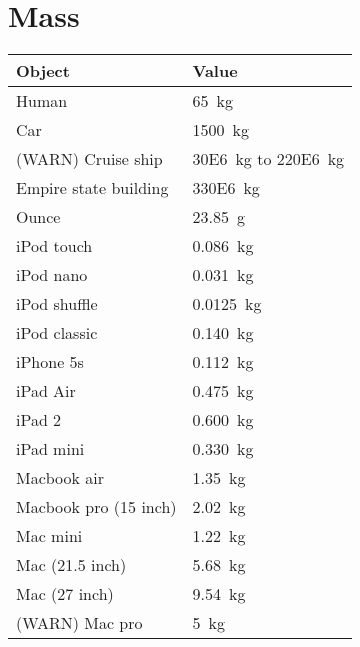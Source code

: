 \documentclass{article}
\begin{document}
\section{Mass}
\begin{table}[H]
	\centering
	\begin{tabularx}{0.75\textwidth}{ X X }
		Object & Value \\
		\hline
		Human & \SI{65}{\kg} \\
		Car & \SI{1500}{\kg} \\
		(WARN) Cruise ship & \SI{30E6}{\kg} to \SI{220E6}{\kg} \\
		Empire state building & \SI{330E6}{\kg} \\
		Ounce & \SI{23.85}{\gram} \\
		iPod touch & \SI{.086}{\kg} \\
		iPod nano & \SI{.031}{\kg} \\
		iPod shuffle & \SI{0.0125}{\kg} \\
		iPod classic & \SI{.140}{\kg} \\
		iPhone 5s & \SI{.112}{\kg} \\
		iPad Air & \SI{.475}{\kg} \\
		iPad 2 & \SI{.600}{\kg} \\
		iPad mini & \SI{.330}{\kg} \\
		Macbook air & \SI{1.35}{\kg} \\
		Macbook pro (15 inch) & \SI{2.02}{\kg} \\
		Mac mini & \SI{1.22}{\kg} \\
		Mac (21.5 inch) & \SI{5.68}{\kg} \\
		Mac (27 inch) & \SI{9.54}{\kg} \\
		(WARN) Mac pro & \SI{5}{\kg} \\
	\end{tabularx}
\end{table}
\end{document}
